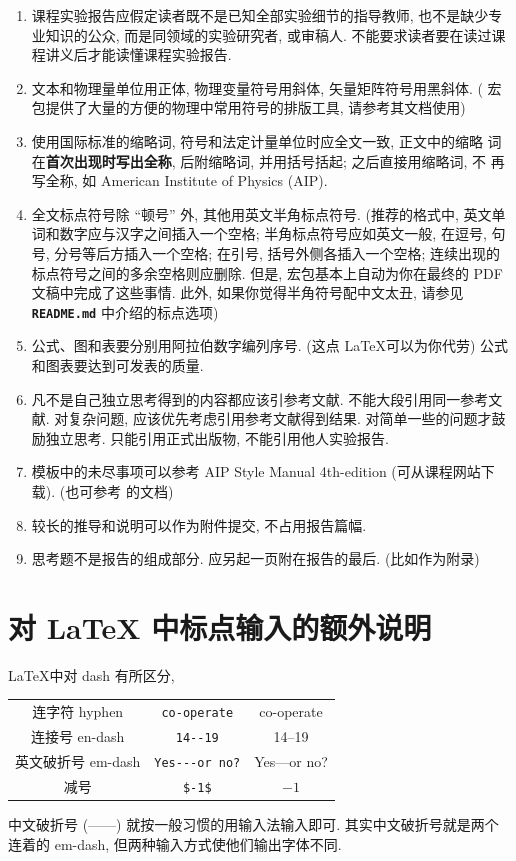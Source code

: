 \documentclass[font=default]{mpltx}
\newcommand{\note}[1]{{\color{gray}#1}}
\newcommand*\file[1]{\textbf{\texttt{#1}}}
\begin{document}
\begin{enumerate}
  \item 课程实验报告应假定读者既不是已知全部实验细节的指导教师, 也不是缺少专业知识的公众, 而是同领域的实验研究者, 或审稿人.
        不能要求读者要在读过课程讲义后才能读懂课程实验报告.
  \item 文本和物理量单位用正体, 物理变量符号用斜体, 矢量矩阵符号用黑斜体.
        \note{( 宏包提供了大量的方便的物理中常用符号的排版工具, 请参考其文档使用)}
  \item 使用国际标准的缩略词, 符号和法定计量单位时应全文一致, 正文中的缩略
        词在\textbf{首次出现时写出全称}, 后附缩略词, 并用括号括起; 之后直接用缩略词, 不
        再写全称, 如 American Institute of Physics (AIP).
  \item 全文标点符号除 ``顿号'' 外, 其他用英文半角标点符号.
        \note{(推荐的格式中, 英文单词和数字应与汉字之间插入一个空格;
          半角标点符号应如英文一般, 在逗号, 句号, 分号等后方插入一个空格;
          在引号, 括号外侧各插入一个空格;
          连续出现的标点符号之间的多余空格则应删除.
          但是, \pkg{xeCJK} 宏包基本上自动为你在最终的 PDF 文稿中完成了这些事情.
          此外, 如果你觉得半角符号配中文太丑, 请参见 \file{README.md} 中介绍的标点选项)}
  \item 公式、图和表要分别用阿拉伯数字编列序号. \note{(这点 \LaTeX 可以为你代劳)}
        公式和图表要达到可发表的质量.
  \item 凡不是自己独立思考得到的内容都应该引参考文献.
        不能大段引用同一参考文献.
        对复杂问题, 应该优先考虑引用参考文献得到结果.
        对简单一些的问题才鼓励独立思考.
        只能引用正式出版物, 不能引用他人实验报告.
  \item 模板中的未尽事项可以参考 AIP Style Manual 4th-edition (可从课程网站下载).
        \note{(也可参考  的文档)}
  \item 较长的推导和说明可以作为附件提交, 不占用报告篇幅.
  \item 思考题不是报告的组成部分.
        应另起一页附在报告的最后. \note{(比如作为附录)}
\end{enumerate}

\section{对 \LaTeX{} 中标点输入的额外说明}
\LaTeX 中对 dash 有所区分,
\begin{center}
  \begin{tabular}{c@{\quad}c@{\ $\rightarrow$\ }c}
    连字符 hyphen    & \verb|co-operate|     & co-operate \\
    连接号 en-dash   & \verb|14--19|         & 14--19 \\
    英文破折号 em-dash & \verb|Yes---or no?| & Yes---or no? \\
    减号            & \verb|$-1$|           & $-1$ \\
  \end{tabular}
\end{center}
中文破折号 (——) 就按一般习惯的用输入法输入即可.
\note{其实中文破折号就是两个连着的 em-dash, 但两种输入方式使他们输出字体不同.}
\end{document}
